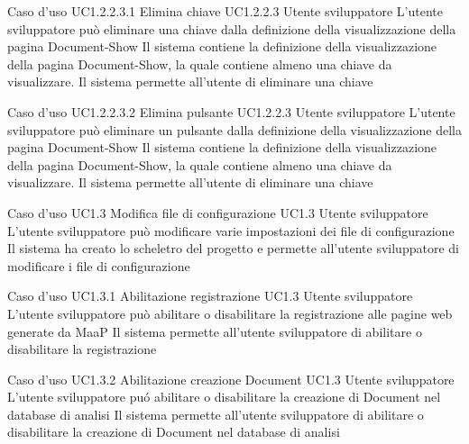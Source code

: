 \UCtitle
{Caso d'uso UC1.2.2.3.1}
{Elimina chiave}
\UC
{UC1.2.2.3}
{Utente sviluppatore}
{L'utente sviluppatore  può eliminare una chiave  dalla definizione della visualizzazione della pagina Document-Show}
{Il sistema contiene la definizione della visualizzazione della pagina Document-Show, la quale contiene almeno una chiave da visualizzare. Il sistema permette all'utente di eliminare una chiave}

\UCtitle
{Caso d'uso UC1.2.2.3.2}
{Elimina pulsante}
\UC
{UC1.2.2.3}
{Utente sviluppatore}
{L'utente sviluppatore può eliminare un pulsante dalla definizione della visualizzazione della pagina Document-Show}
{Il sistema contiene la definizione della visualizzazione della pagina Document-Show, la quale contiene almeno una chiave da visualizzare. Il sistema permette all'utente di eliminare una chiave}


\UCtitle
{Caso d'uso UC1.3}
{Modifica file di configurazione}
\UC
{UC1.3}
{Utente sviluppatore}
{L'utente sviluppatore  può modificare varie impostazioni dei file di configurazione}
{Il sistema ha creato lo scheletro del progetto e permette all'utente sviluppatore di modificare i file di configurazione}

\UCtitle
{Caso d'uso UC1.3.1}
{Abilitazione registrazione}
\UC
{UC1.3}
{Utente sviluppatore}
{L'utente sviluppatore può abilitare o disabilitare la registrazione alle pagine web generate da MaaP}
{Il sistema permette all'utente sviluppatore di abilitare o disabilitare la registrazione}

\UCtitle
{Caso d'uso UC1.3.2}
{Abilitazione creazione Document}
\UC
{UC1.3}
{Utente sviluppatore}
{L'utente sviluppatore pu\'o abilitare o disabilitare la creazione di Document nel database di analisi}
{Il sistema permette all'utente sviluppatore di abilitare o disabilitare la creazione di Document nel database di analisi}

